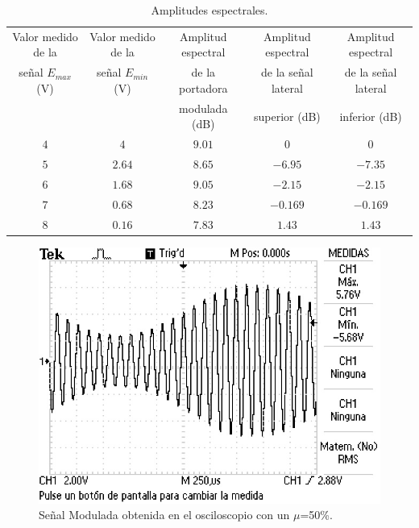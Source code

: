 \documentclass[12pt,graphicx,caption,rotating]{article}
\begin{document}
\begin{table}[H]
  \centering
  \caption{Amplitudes espectrales.}
    \begin{tabular}{|c|c|c|c|c|} \hline
      Valor medido de la & Valor medido de la & Amplitud espectral & Amplitud espectral & Amplitud espectral \\
      señal $E_{max}$ (V) & señal $E_{min}$ (V) & de la portadora & de la señal lateral & de la señal lateral \\
      &  & modulada (dB) & superior (dB) & inferior (dB) \\ \hline
      $4$ & $4$ & $9.01$ & $0$ & $0$ \\ \hline
      $5$ & $2.64$ & $8.65$ & $-6.95$ & $-7.35$ \\ \hline
      $6$ & $1.68$ & $9.05$ & $-2.15$ & $-2.15$ \\ \hline
      $7$ & $0.68$ & $8.23$ & $-0.169$ & $-0.169$ \\ \hline
      $8$ & $0.16$ & $7.83$ & $1.43$ & $1.43$ \\ \hline
    \end{tabular}
  \label{tab3}
\end{table}

\begin{figure}
  \centering
   \includegraphics[scale=0.5]{fig1.jpg}
    \caption{Señal Modulada obtenida en el osciloscopio con un $\mu$=50\%.}
  \label{fig1}
\end{figure}
\end{document}

